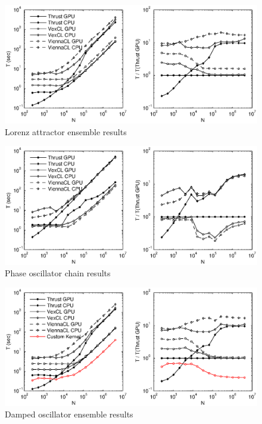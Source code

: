 \documentclass[1p]{elsarticle}
\begin{document}
\begin{figure}
    \begin{center}
	\includegraphics[width=\textwidth]{data/lorenz_ensemble/perfcmp}
    \end{center}
    \caption{Lorenz attractor ensemble results}
    \label{fig:lorenz:perf}
\end{figure}

\begin{figure}
    \begin{center}
	\includegraphics[width=\textwidth]{data/phase_oscillator_chain/perfcmp}
    \end{center}
    \caption{Phase oscillator chain results}
    \label{fig:phase:perf}
\end{figure}

\begin{figure}
    \begin{center}
	\includegraphics[width=\textwidth]{data/damped_oscillator/perfcmp}
    \end{center}
    \caption{Damped oscillator ensemble results}
    \label{fig:damped:perf}
\end{figure}
\end{document}
